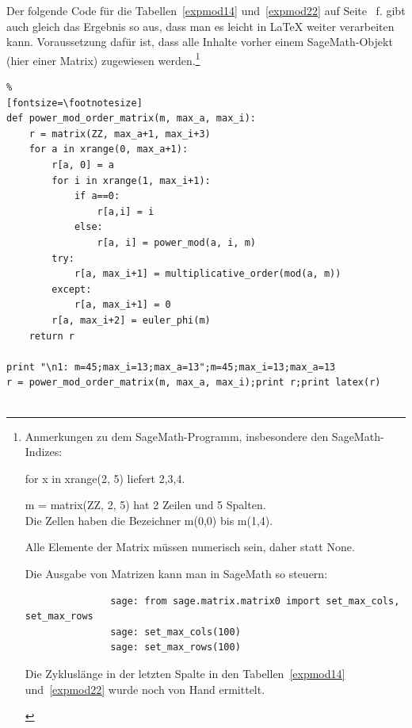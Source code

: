 \begin{refsegment}
\newpage
\hypertarget{nt:AppArith3d}{}
\label{nt:AppArith3d}{}
Der folgende Code für die Tabellen~\ref{expmod14} und~\ref{expmod22}
auf Seite~\pageref{expmod14} f. gibt auch gleich das Ergebnis so aus,
dass man es leicht in LaTeX weiter verarbeiten kann. Voraussetzung dafür ist,
dass alle Inhalte vorher einem SageMath-Objekt (hier einer Matrix) zugewiesen
werden.\footnote{%
        Anmerkungen zu dem SageMath-Programm, insbesondere den
        SageMath-Indizes:
        \begin{compactitem}
         \item for x in xrange(2, 5) liefert 2,3,4.
         \item m = matrix(ZZ, 2, 5) hat 2 Zeilen und 5 Spalten.\\
               Die Zellen haben die Bezeichner m(0,0) bis m(1,4).
         \item Alle Elemente der Matrix müssen numerisch sein, daher \grqq
               statt \glqq None\grqq.
         \item Die Ausgabe von Matrizen kann man in SageMath so steuern:
\begin{Verbatim}
               sage: from sage.matrix.matrix0 import set_max_cols, set_max_rows
               sage: set_max_cols(100)
               sage: set_max_rows(100)
\end{Verbatim}
         \item Die Zykluslänge in der letzten Spalte in den
               Tabellen~\ref{expmod14} und~\ref{expmod22}
               wurde noch von Hand ermittelt.
        \end{compactitem}
        \vspace{-\baselineskip} %
        }

\begin{sagecode}
\begin{Verbatim}%
[fontsize=\footnotesize]
def power_mod_order_matrix(m, max_a, max_i):
    r = matrix(ZZ, max_a+1, max_i+3)
    for a in xrange(0, max_a+1):
        r[a, 0] = a
        for i in xrange(1, max_i+1):
            if a==0:
                r[a,i] = i
            else:
                r[a, i] = power_mod(a, i, m)
        try:
            r[a, max_i+1] = multiplicative_order(mod(a, m))
        except:
            r[a, max_i+1] = 0
        r[a, max_i+2] = euler_phi(m)
    return r

print "\n1: m=45;max_i=13;max_a=13";m=45;max_i=13;max_a=13
r = power_mod_order_matrix(m, max_a, max_i);print r;print latex(r)


\end{Verbatim}
\end{sagecode}
\end{refsegment}
